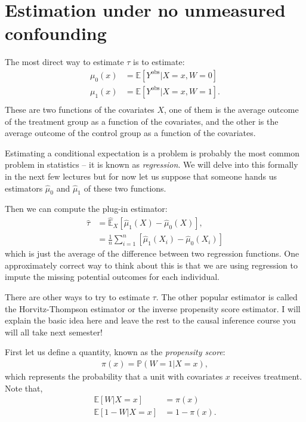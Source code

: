 \documentclass[twoside,12pt]{article}
\begin{document}
\section{Estimation under no unmeasured confounding}
The most direct way to estimate $\tau$ is to estimate:
\begin{align*}
\mu_0(x) &= \mathbb{E} [Y^{\text{obs}} | X = x, W = 0] \\
\mu_1(x) &=  \mathbb{E} [Y^{\text{obs}} | X = x, W = 1]. \\
\end{align*}
These are two functions of the covariates $X$, one of them is the average outcome of the treatment group as a function of the covariates, and the other is the average outcome of the control group as a function of the covariates.

Estimating a conditional expectation is a problem is probably the most common problem in statistics -- it is known as \emph{regression}. We will delve into this formally in the next few lectures but for now let us suppose that someone hands us estimators $\widehat{\mu}_0$ and $\widehat{\mu}_1$ of these two 
functions. 

Then we can compute the plug-in estimator:
\begin{align*}
\widehat{\tau} &= \widehat{\mathbb{E}}_X \left[ \widehat{\mu}_1(X) - \widehat{\mu}_0(X)\right], \\
&= \frac{1}{n} \sum_{i=1}^n \left[\widehat{\mu}_1(X_i) - \widehat{\mu}_0(X_i)\right]
\end{align*}
which is just the average of the difference between two regression functions. One approximately correct way to think about this is that we are using regression to impute the missing potential outcomes for each individual.

There are other ways to try to estimate $\tau$. The other popular estimator is called the Horvitz-Thompson estimator or the inverse propensity score estimator. I will explain the basic idea here and leave the rest to the causal inference course you will all take next semester!

First let us define a quantity, known as the \emph{propensity score}:
\begin{align*}
\pi(x) = \mathbb{P}(W = 1 | X = x),
\end{align*}
which represents the probability that a unit with covariates $x$ receives treatment. Note that,
\begin{align*}
\mathbb{E}[W | X = x] &= \pi(x) \\
\mathbb{E}[1 - W | X = x] &= 1 - \pi(x).
\end{align*}
\end{document}

